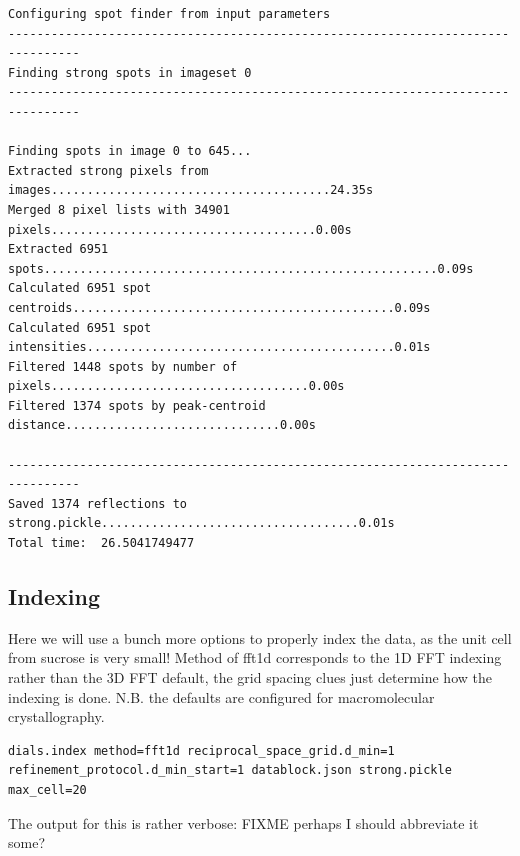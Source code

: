 \documentclass[a4paper, 11pt]{article}
\begin{document}
{\small
\begin{verbatim}
Configuring spot finder from input parameters
--------------------------------------------------------------------------------
Finding strong spots in imageset 0
--------------------------------------------------------------------------------

Finding spots in image 0 to 645...
Extracted strong pixels from images.......................................24.35s
Merged 8 pixel lists with 34901 pixels.....................................0.00s
Extracted 6951 spots.......................................................0.09s
Calculated 6951 spot centroids.............................................0.09s
Calculated 6951 spot intensities...........................................0.01s
Filtered 1448 spots by number of pixels....................................0.00s
Filtered 1374 spots by peak-centroid distance..............................0.00s

--------------------------------------------------------------------------------
Saved 1374 reflections to strong.pickle....................................0.01s
Total time:  26.5041749477
\end{verbatim}
}

\subsection{Indexing}

Here we will use a bunch more options to properly index the data, as
the unit cell from sucrose is very small! Method of fft1d corresponds
to the 1D FFT indexing rather than the 3D FFT default, the grid
spacing clues just determine how the indexing is done. N.B. the
defaults are configured for macromolecular crystallography.

{\small
\begin{verbatim}
dials.index method=fft1d reciprocal_space_grid.d_min=1
refinement_protocol.d_min_start=1 datablock.json strong.pickle
max_cell=20
\end{verbatim}
}

\noindent
The output for this is rather verbose: FIXME perhaps I should
abbreviate it some?
\end{document}
